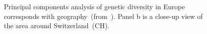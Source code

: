 \documentclass[12pt]{article}
\begin{document}
\begin{figure}
\caption{Principal components analysis of genetic diversity in Europe
  corresponds with
  geography~(from~\cite{Novembre-etal-2008}). Panel b is a close-up
  view of the area around Switzerland~(CH).}\label{fig:human-PCA}
\end{figure}




\ccLicense
\end{document}
